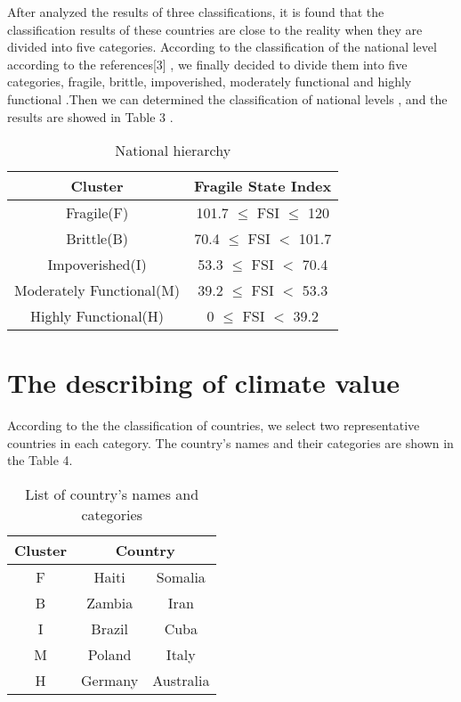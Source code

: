 \documentclass{mcmthesis}
\begin{document}
After analyzed the results of three classifications, it is found that the classification results of these countries are close to the reality when they are divided into five categories. According to the classification of the national level according to the references[3] , we finally decided to divide them into five categories, fragile, brittle, impoverished, moderately functional and highly functional .Then we can determined the classification of national levels , and the results are showed in Table 3 .

\begin{table}[htbp]
\begin{center}
\caption{National hierarchy}
\begin{tabular}{|c|c|}   %
\hline
Cluster &   Fragile State Index   \\%
\hline
Fragile(F) & 101.7 $\leq$ FSI $\leq$ 120\\
\hline
Brittle(B) &  70.4 $\leq$ FSI $<$ 101.7\\
\hline
Impoverished(I)	&53.3 $\leq$ FSI $<$ 70.4 \\
\hline
Moderately Functional(M)	& 39.2 $\leq$ FSI $<$ 53.3 \\
\hline
Highly Functional(H)& 0 $\leq$ FSI $<$ 39.2 \\
\hline
\end{tabular}
\end{center}
\end{table}


\section{The describing of climate value}
According to the the classification of countries, we select two representative countries in each category. The country's names and their categories are shown in the Table 4.

\begin{table}[htbp]
\begin{center}
\caption{List of country's names and categories}
\begin{tabular}{|c|c|c|}   %
\hline
Cluster & \multicolumn{2}{c|}{  Country }  \\%
\hline
F &Haiti&Somalia \\
\hline
B &Zambia&Iran\\
\hline
I	& Brazil&Cuba\\
\hline
M	&Poland&Italy\\
\hline
H&Germany&Australia\\
\hline
\end{tabular}
\end{center}
\end{table}
\end{document}
